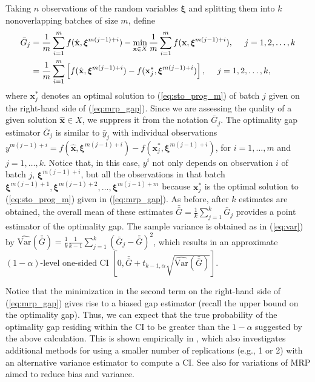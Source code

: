 \documentclass[12pt]{article}
\newcommand{\varh}[1]{\widehat{\mathrm{Var}} \left( #1 \right)}
\newcommand{\X}{X}
\newcommand{\x}{\mathbf{x}}
\newcommand{\xh}{{\hat{\x}}}
\newcommand{\xs}{\x^*}
\newcommand{\xit}{\boldsymbol{\xi}}
\newcommand{\gb}{\bar{G}}
\newcommand{\gbb}{\bar{\gb}}
\newcommand{\yb}{\bar{y}}
\begin{document}
Taking $n$ observations of the random variables $\xit$ and splitting them into $k$ nonoverlapping batches of size $m$, define 
\begin{align} 
	\gb_j  & = \frac{1}{m} \sum_{i = 1}^{m} f(\xh, \xit^{m(j-1)+i}) - \min_{\x \in X} \frac{1}{m} \sum_{i=1}^{m} f(\x, \xit^{m(j-1)+i}), \ \ \ \ j = 1,2, \dots, k \label{eq:mrp_gap}\\
         & = \frac{1}{m} \sum_{i = 1}^{m} \left[ f(\xh, \xit^{m(j-1)+i}) -  f(\xs_j, \xit^{m(j-1)+i}) \right], \ \ \ \ j = 1,2, \dots, k, \notag
\end{align}
where $\xs_j$ denotes an optimal solution to (\ref{eq:sto_prog_m}) of batch $j$ given on the right-hand side of (\ref{eq:mrp_gap}).    
Since we are assessing the quality of a given solution $\xh \in \X$, we suppress it from the notation $\gb_j$.
The optimality gap estimator $\gb_j$ is similar to $\yb_j$ with individual observations $y^{m(j-1)+i} = f(\xh,\xit^{m(j-1)+i}) - f(\xs_j,\xit^{m(j-1)+i})$, for $i=1,\ldots,m$ and $j=1,\ldots, k$.
Notice that, in this case, $y^i$ not only depends on observation $i$ of batch $j$, $\xit^{m(j-1)+i}$, but all the observations in that batch $\xit^{m(j-1)+1},\xit^{m(j-1)+2},\ldots,\xit^{m(j-1)+m}$ because $\xs_j$ is the optimal solution to (\ref{eq:sto_prog_m}) given in (\ref{eq:mrp_gap}).   
As before, after $k$ estimates are obtained, the overall mean of these estimates $\gbb = \frac{1}{k} \sum_{j=1}^k \gb_j$ provides a point estimator of the optimality gap.  
The sample variance is obtained as in (\ref{eq:var}) by $\varh{\gbb} = \frac{1}{k} \frac{1}{k-1} \sum_{j=1}^k (\gb_j - \gbb)^2$, which results in an approximate $(1-\alpha)$-level one-sided CI $\left[0, \gbb + t_{k-1,\alpha} \sqrt{\varh{\gbb}} \right]$.

Notice that the minimization in the second term on the right-hand side of (\ref{eq:mrp_gap}) gives rise to a biased gap estimator (recall the upper bound on the optimality gap).  
Thus, we can expect that the true probability of the optimality gap residing within the CI to be greater than the $1 - \alpha$ suggested by the above calculation.  
This is shown empirically in \citep{Bayraksan2006}, which also investigates additional methods for using a smaller number of replications (e.g., 1 or 2) with an alternative variance estimator to compute a CI.  
See also \citep{bayraksan_morton_09,partani2006jackknife,partani_07} for variations of MRP aimed to reduce bias and variance.



\end{document}
